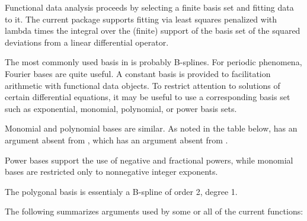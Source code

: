 \documentclass{article}
\begin{document}
\begin{Description}\relax
Functional data analysis proceeds by selecting a finite basis set and
fitting data to it.  The current  package supports fitting
via least squares penalized with lambda times the integral over the
(finite) support of the basis set of the squared deviations from a
linear differential operator.
\end{Description}
\begin{Details}\relax
The most commonly used basis in  is probably B-splines.  For
periodic phenomena, Fourier bases are quite useful.  A constant basis
is provided to facilitation arithmetic with functional data objects.
To restrict attention to solutions of certain differential equations,
it may be useful to use a corresponding basis set such as exponential,
monomial, polynomial, or power basis sets.

Monomial and polynomial bases are similar.  As noted in the table
below,  has an argument 
absent from , which has an argument
 absent from .

Power bases support the use of negative and fractional powers, while
monomial bases are restricted only to nonnegative integer exponents.

The polygonal basis is essentialy a B-spline of order 2, degree 1.

The following summarizes arguments used by some or all of the current
 functions:

\end{Details}
\end{document}
